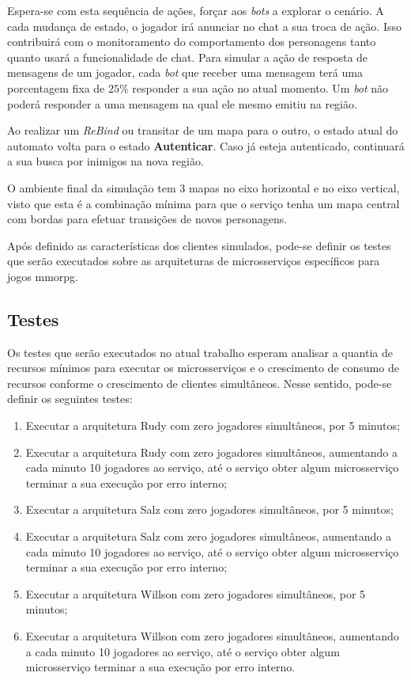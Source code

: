 Espera-se com esta sequência de ações, forçar aos \textit{bots} a explorar o cenário.
%
A cada mudança de estado, o jogador irá anunciar no chat a sua troca de ação.
%
Isso contribuirá com o monitoramento do comportamento dos personagens tanto quanto usará a funcionalidade de chat.
%
Para simular a ação de resposta de mensagens de um jogador, cada \textit{bot} que receber uma mensagem terá uma porcentagem fixa de $25\%$ responder a sua ação no atual momento.
%
Um \textit{bot} não poderá responder a uma mensagem na qual ele mesmo emitiu na região.


Ao realizar um \textit{ReBind} ou transitar de um mapa para o outro, o estado atual do automato volta para o estado \textbf{Autenticar}.
%
Caso já esteja autenticado, continuará a sua busca por inimigos na nova região.

O ambiente final da simulação tem 3 mapas no eixo horizontal e no eixo vertical, visto que esta é a combinação mínima para que o serviço tenha um mapa central com bordas para efetuar transições de novos personagens.

Após definido as características dos clientes simulados, pode-se definir os testes que serão executados sobre as arquiteturas de microsserviços específicos para jogos \ac{mmorpg}.

\subsection{Testes}

Os testes que serão executados no atual trabalho esperam analisar a quantia de recursos mínimos para executar os microsserviços e o crescimento de consumo de recursos conforme o crescimento de clientes simultâneos.
%
Nesse sentido, pode-se definir os seguintes testes:

\begin{enumerate}
  \item Executar a arquitetura Rudy com zero jogadores simultâneos, por 5 minutos;
  \item Executar a arquitetura Rudy com zero jogadores simultâneos, aumentando a cada minuto 10 jogadores ao serviço, até o serviço obter algum microsserviço terminar a sua execução por erro interno;
  \item Executar a arquitetura Salz com zero jogadores simultâneos, por 5 minutos;
  \item Executar a arquitetura Salz com zero jogadores simultâneos, aumentando a cada minuto 10 jogadores ao serviço, até o serviço obter algum microsserviço terminar a sua execução por erro interno;
  \item Executar a arquitetura Willson com zero jogadores simultâneos, por 5 minutos;
  \item Executar a arquitetura Willson com zero jogadores simultâneos, aumentando a cada minuto 10 jogadores ao serviço, até o serviço obter algum microsserviço terminar a sua execução por erro interno.
\end{enumerate}

